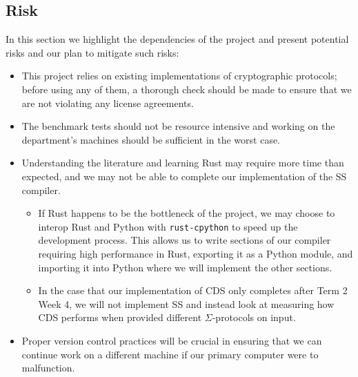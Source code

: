 \subsection{Risk}
In this section we highlight the dependencies of the project and present potential risks and our plan to mitigate such risks:
\begin{itemize}
    \item This project relies on existing implementations of cryptographic protocols; before using any of them, a thorough check should be made to ensure that we are not violating any license agreements.
    \item The benchmark tests should not be resource intensive and working on the department's machines should be sufficient in the worst case. 
    \item Understanding the literature and learning Rust may require more time than expected, and we may not be able to complete our implementation of the SS compiler.
    \begin{itemize}
        \item If Rust happens to be the bottleneck of the project, we may choose to interop Rust and Python with \texttt{rust-cpython} to speed up the development process. This allows us to write sections of our compiler requiring high performance in Rust, exporting it as a Python module, and importing it into Python where we will implement the other sections.
        \item In the case that our implementation of CDS only completes after Term 2 Week 4, we will not implement SS and instead look at measuring how CDS performs when provided different $\Sigma$-protocols on input.
    \end{itemize}
    \item Proper version control practices will be crucial in ensuring that we can continue work on a different machine if our primary computer were to malfunction.
\end{itemize}
 




